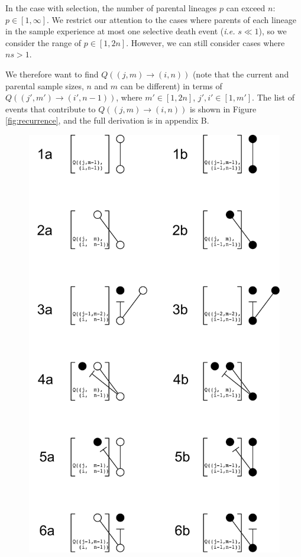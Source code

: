 \documentclass[review]{elsarticle}
\newcommand{\ra}{\rightarrow}
\begin{document}
In the case with selection, the number of parental lineages $p$ can exceed $n$: $p\in[1, \infty]$.
We restrict our attention to the cases where parents of each lineage in the sample experience at
most one selective death event (\textit{i.e.} $s \ll 1$), so we consider the range of $p \in [1, 2n]$.
However, we can still consider cases where $ns > 1$.

We therefore want to find $Q((j,m)\ra(i,n))$ (note that the current and parental sample sizes, $n$
and $m$ can be different) in terms of $Q((j',m')\ra(i',n-1))$, where $m' \in [1, 2n]$, $j',i' \in
[1, m']$. The list of events that contribute to $Q((j,m)\ra(i,n))$ is shown in Figure
\ref{fig:recurrence}, and the full derivation is in appendix B.

\begin{figure}
  \centering
  \includegraphics[height=0.7\textheight]{fig/recurrence.pdf}

\end{figure}
\end{document}
